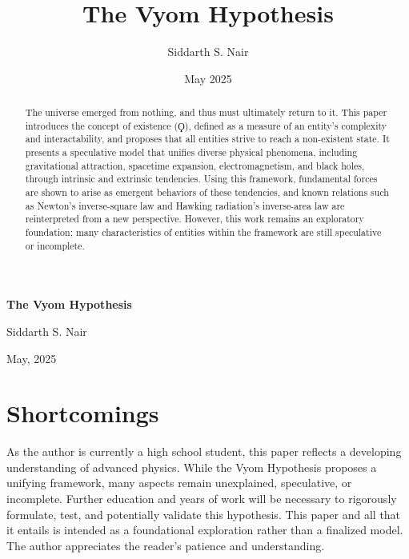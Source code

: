 \documentclass{article}
\title{The Vyom Hypothesis}
\author{Siddarth S. Nair}
\date{May 2025}
\begin{document}
\begin{titlepage}
    \centering
    \vspace*{\fill}
    {\Huge\bfseries The Vyom Hypothesis \par}
    \vspace{1cm}
    {\Large Siddarth S. Nair \par}
    \vspace{0.5cm}
    {\large May, 2025 \par}
    \vspace*{\fill}
    \thispagestyle{empty}
\end{titlepage}



\newpage
\sectionfont{\fontsize{23}{22}\bfseries}
\subsectionfont{\fontsize{15}{22}\bfseries}



\begin{abstract}

The universe emerged from nothing, and thus must ultimately return to it. 
This paper introduces the concept of existence ($\Koppa$), defined as a measure of an entity's complexity and interactability, and proposes that all entities strive to reach a non-existent state.
It presents a speculative model that unifies diverse physical phenomena, including gravitational attraction, spacetime expansion, electromagnetism, and black holes, through intrinsic and extrinsic tendencies. 
Using this framework, fundamental forces are shown to arise as emergent behaviors of these tendencies, and known relations such as Newton's inverse-square law and Hawking radiation's inverse-area law are reinterpreted from a new perspective. 
However, this work remains an exploratory foundation; many characteristics of entities within the framework are still speculative or incomplete.

\end{abstract}



\newpage
\tableofcontents



\newpage
\section{Shortcomings}


As the author is currently a high school student, this paper reflects a developing understanding of advanced physics. 
While the Vyom Hypothesis proposes a unifying framework, many aspects remain unexplained, speculative, or incomplete. 
Further education and years of work will be necessary to rigorously formulate, test, and potentially validate this hypothesis. 
This paper and all that it entails is intended as a foundational exploration rather than a finalized model. 
The author appreciates the reader’s patience and understanding.
\end{document}

